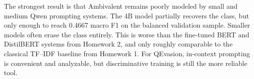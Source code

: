 \documentclass[12pt]{fphw}
\newcommand{\AMB}{Ambivalent}
\begin{document}
The strongest result is that \AMB{} remains poorly modeled by small and medium Qwen prompting systems. The 4B model partially recovers the class, but only enough to reach 0.4667 macro F1 on the balanced validation sample. Smaller models often erase the class entirely. This is worse than the fine-tuned BERT and DistilBERT systems from Homework 2, and only roughly comparable to the classical TF--IDF baseline from Homework 1. For QEvasion, in-context prompting is convenient and analyzable, but discriminative training is still the more reliable tool.

\nocite{*}


\end{document}
